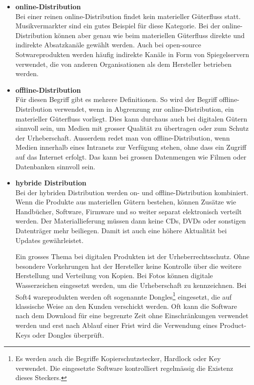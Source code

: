 \begin{itemize}
    \item\textbf{online-Distribution} \\
    Bei einer reinen online-Distribution findet kein materieller Güterfluss statt.
    Musikvermarkter sind ein gutes Beispiel für diese Kategorie. Bei der
    online-Distribution können aber genau wie beim materiellen Güterfluss
    direkte und indirekte Absatzkanäle gewählt werden. Auch bei open-source
    Sotwareprodukten werden häufig indirekte Kanäle in Form von Spiegelservern
    verwendet, die von anderen Organisationen als dem Hersteller betrieben werden.
    \item\textbf{offline-Distribution} \\
    Für diesen Begriff gibt es mehrere Definitionen. So wird der Begriff
    offline-Distribution verwendet, wenn in Abgrenzung zur online-Distribution,
    ein materieller Güterfluss vorliegt. Dies kann durchaus auch bei digitalen
    Gütern sinnvoll sein, um Medien mit grosser Qualität zu übertragen oder zum
    Schutz der Urheberschaft. Ausserdem redet man von offline-Distribution, wenn
    Medien innerhalb eines Intranets zur Verfügung stehen, ohne dass ein Zugriff
    auf das Internet erfolgt. Das kann bei grossen Datenmengen wie Filmen oder
    Datenbanken sinnvoll sein.
    \item\textbf{hybride Distribution} \\
    Bei der hybriden Distribution werden on- und offline-Distribution kombiniert.
    Wenn die Produkte aus materiellen Gütern bestehen, können Zusätze wie
    Handbücher, Software, Firmware und so weiter separat elektronisch verteilt
    werden. Der Materiallieferung müssen dann keine CDs, DVDs oder sonstigen
    Datenträger mehr beiliegen. Damit ist auch eine höhere Aktualität bei Updates
    gewährleistet.

    Ein grosses Thema bei digitalen Produkten ist der Urheberrechtsschutz. Ohne
    besondere Vorkehrungen hat der Hersteller keine Kontrolle über die weitere
    Herstellung und Verteilung von Kopien. Bei Fotos können digitale Wasserzeichen
    eingesetzt werden, um die Urheberschaft zu kennzeichnen. Bei Soft4 wareprodukten
    werden oft sogenannte Dongles\footnote{Es werden auch die Begriffe Kopierschutzstecker,
    Hardlock oder Key verwendet. Die eingesetzte Software kontrolliert regelmässig
    die Existenz dieses Steckers.}
    eingesetzt, die auf klassische Weise an den
    Kunden verschickt werden. Oft kann die Software nach dem Download für eine
    begrenzte Zeit ohne Einschränkungen verwendet werden und erst nach Ablauf
    einer Frist wird die Verwendung eines Product-Keys oder Dongles überprüft.
\end{itemize}

